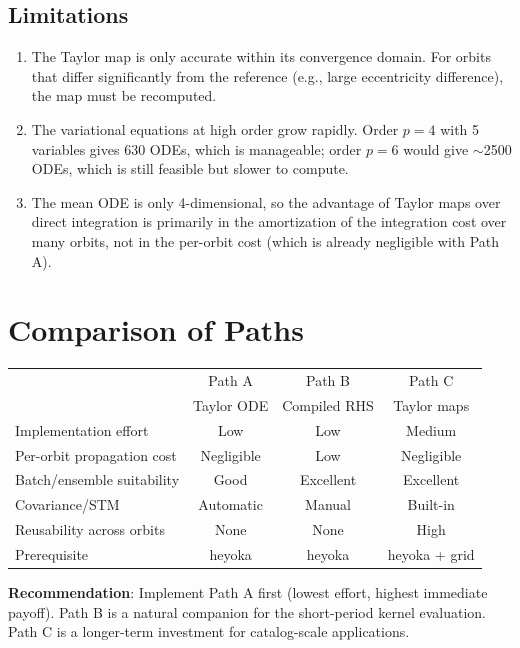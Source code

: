 \documentclass[11pt]{article}
\begin{document}
\subsection{Limitations}

\begin{enumerate}
\item The Taylor map is only accurate within its convergence domain. For
orbits that differ significantly from the reference (e.g., large eccentricity
difference), the map must be recomputed.

\item The variational equations at high order grow rapidly. Order $p = 4$
with 5 variables gives 630 ODEs, which is manageable; order $p = 6$ would
give $\sim$2500 ODEs, which is still feasible but slower to compute.

\item The mean ODE is only 4-dimensional, so the advantage of Taylor maps
over direct integration is primarily in the amortization of the integration
cost over many orbits, not in the per-orbit cost (which is already
negligible with Path A).
\end{enumerate}


\section{Comparison of Paths}

\begin{center}
\begin{tabular}{lccc}
\toprule
& Path A & Path B & Path C \\
& Taylor ODE & Compiled RHS & Taylor maps \\
\midrule
Implementation effort & Low & Low & Medium \\
Per-orbit propagation cost & Negligible & Low & Negligible \\
Batch/ensemble suitability & Good & Excellent & Excellent \\
Covariance/STM & Automatic & Manual & Built-in \\
Reusability across orbits & None & None & High \\
Prerequisite & heyoka & heyoka & heyoka + grid \\
\bottomrule
\end{tabular}
\end{center}

\textbf{Recommendation}: Implement Path A first (lowest effort, highest
immediate payoff). Path B is a natural companion for the short-period kernel
evaluation. Path C is a longer-term investment for catalog-scale
applications.
\end{document}
